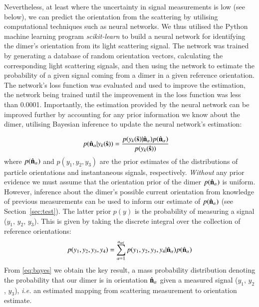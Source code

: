 \documentclass[final,  3p]{elsarticle}
\begin{document}
Nevertheless, at least where the uncertainty in signal measurements is low (see below), we can predict the orientation from the scattering by utilising computational techniques such as neural networks. We thus utilised the Python machine learning program \textit{scikit-learn} to build a neural network for identifying the dimer's orientation from its light scattering signal. The network was trained by generating a database of random orientation vectors, calculating the corresponding light scattering signals, and then using the network to estimate the probability of a given signal coming from a dimer in a given reference orientation. The network's loss function was evaluated and used to improve the estimation, the network being trained until the improvement in the loss function was less than 0.0001. 
%
Importantly, the estimation provided by the neural network can be improved further by accounting for any prior information we know about the dimer, utilising Bayesian inference to update the neural network's estimation: 

\begin{align}
  \label{eq:bayes}
  p(\hat{\bf n}_\alpha| y_k(\hat{\bf s}))
  &=
    \frac{p(y_k(\hat{\bf s})|\hat{\bf n}_\alpha)
    p(\hat{\bf n}_\alpha)}{p(y_k(\hat{\bf s}))}
\end{align}
where $p(\hat{\bf n}_\alpha)$ and $p(y_1, y_2, y_3)$ are the prior estimates of the distributions of particle orientations and instantaneous signals, respectively.
\textit{Without} any prior evidence we must assume that the orientation prior of the dimer
$p(\hat{\bf n}_{\alpha})$ is uniform. However, inference about the dimer's possible current orientation from knowledge of previous
measurements can be used to inform our estimate of $p(\hat{\bf n}_{\alpha})$ (see Section~\ref{sec:test}). The latter prior $p(y)$ is the probability of measuring a signal ($y_1$, $y_2$, $y_3$).  This is given by taking the discrete integral over the collection of reference orientations:
\begin{align}
  p(y_1, y_2, y_3, y_4)
  =
  \sum_{\alpha=1}^{n_{\rm ref}}
  p(y_1, y_2, y_3, y_4|\hat{\bf n}_\alpha)
  p(\hat{\bf n}_\alpha)
\end{align}
From \eqref{eq:bayes} we obtain the key result, a mass probability distribution denoting the
probability that our dimer is in orientation $\hat{\bf n}_{\alpha}$ given a measured
signal ($y_1$, $y_2$, $y_3$), \textit{i.e.} an estimated mapping from scattering measurement to orientation estimate. 

\end{document}
